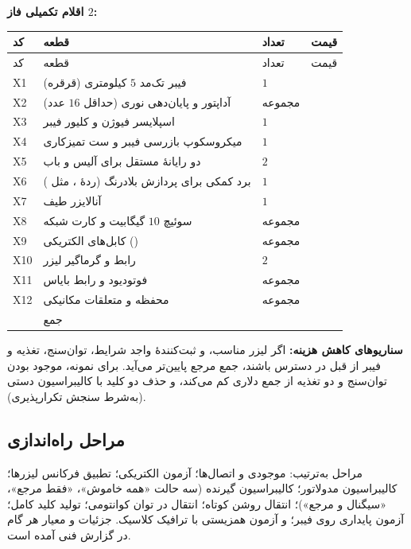 \textbf{اقلام تکمیلی فاز $2$:}
\begin{longtable}{C{0.9cm}R{8.7cm}C{1.2cm}C{3.1cm}}
\toprule {} کد & قطعه & تعداد & قیمت \\ \midrule
\endfirsthead
\toprule {} کد & قطعه & تعداد & قیمت \\ \midrule
\endhead
X1 & فیبر تک‌مد $5$ کیلومتری (قرقره) & $1$ &  \\
X2 & آداپتور و پایان‌دهی نوری  (حداقل $16$ عدد) & مجموعه &  \\
X3 & اسپلایسر فیوژن و کلیور فیبر & $1$ &  \\
X4 & میکروسکوپ بازرسی فیبر و ست تمیزکاری & $1$ &  \\
X5 & دو رایانهٔ مستقل برای آلیس و باب & $2$ &  \\
X6 & برد  کمکی برای پردازش بلادرنگ (ردهٔ ، مثل ) & $1$ &  \\
X7 & آنالایزر طیف  & $1$ &  \\
X8 & سوئیچ $10$ گیگابیت و کارت شبکه & مجموعه &  \\
X9 & کابل‌های الکتریکی () & مجموعه &  \\
X10 & رابط و گرماگیر لیزر & $2$ &  \\
X11 & فوتودیود و رابط بایاس & مجموعه &  \\
X12 & محفظه و متعلقات مکانیکی & مجموعه &  \\
\midrule & جمع &  &  \\
\bottomrule\end{longtable}

\textbf{سناریوهای کاهش هزینه:} اگر لیزر مناسب،  و ثبت‌کنندهٔ واجد شرایط، توان‌سنج، تغذیه و فیبر از قبل در دسترس باشند، جمع مرجع پایین‌تر می‌آید. برای نمونه، موجود بودن توان‌سنج و دو تغذیه  از جمع دلاری کم می‌کند، و حذف دو کلید با کالیبراسیون دستی  (به‌شرط سنجش تکرارپذیری).

\subsection{مراحل راه‌اندازی}
مراحل به‌ترتیب: موجودی و اتصال‌ها؛ آزمون الکتریکی؛ تطبیق فرکانس لیزرها؛ کالیبراسیون مدولاتور؛ کالیبراسیون گیرنده (سه حالت «همه خاموش»، «فقط مرجع»، «سیگنال و مرجع»)؛ انتقال روشن کوتاه؛ انتقال در توان کوانتومی؛ تولید کلید کامل؛ آزمون پایداری روی فیبر؛ و آزمون همزیستی با ترافیک کلاسیک. جزئیات و معیار هر گام در گزارش فنی آمده است\cite{cvreport}.

